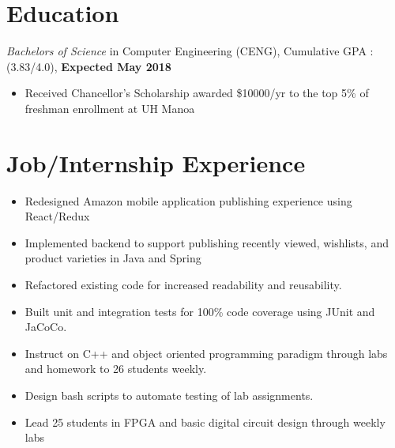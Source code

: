\documentclass{resume}
\begin{document}
\raggedbottom
{}

\section{%
Education}
\textit{Bachelors of Science} in Computer Engineering (CENG), Cumulative GPA : (3.83/4.0), \textbf{Expected May 2018}
\begin{itemize}[noitemsep,nolistsep]
  \item Received Chancellor's Scholarship awarded \$10000/yr to the top 5\% of freshman enrollment at UH Manoa
\end{itemize}
\section{%
 Job/Internship Experience}

 \begin{itemize}[noitemsep,nolistsep]
   \item Redesigned Amazon mobile application publishing experience using React/Redux
   \item Implemented backend to support publishing recently viewed, wishlists, and product varieties in Java and Spring
   \item Refactored existing code for increased readability and reusability.
   \item Built unit and integration tests for 100\% code coverage using JUnit and JaCoCo.
 \end{itemize}

\begin{itemize}[noitemsep,nolistsep]
  \item Instruct on C++ and object oriented programming paradigm through labs and homework to 26 students weekly.
  \item Design bash scripts to automate testing of lab assignments.
  \item Lead 25 students in FPGA and basic digital circuit design through weekly labs
\end{itemize}
\end{document}
